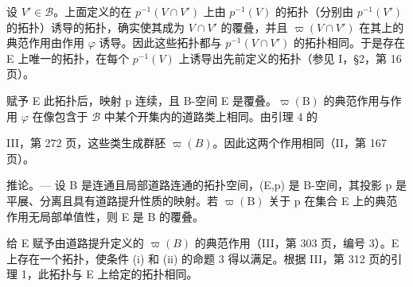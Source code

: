 设 \(V' \in \mathcal{B}\)。上面定义的在 \(p^{-1}(V \cap V')\) 上由 \(p^{-1}(V)\) 的拓扑（分别由 \(p^{-1}(V')\) 的拓扑）诱导的拓扑，确实使其成为 \(V \cap V'\) 的覆叠，并且 \(\varpi(V \cap V')\) 在其上的典范作用由作用 \(\varphi\) 诱导。因此这些拓扑都与 \(p^{-1}(V \cap V')\) 的拓扑相同。于是存在 E 上唯一的拓扑，在每个 \(p^{-1}(V)\) 上诱导出先前定义的拓扑（参见 I，§2，第 16 页）。

赋予 E 此拓扑后，映射 p 连续，且 B-空间 E 是覆叠。\(\varpi(\mathrm{B})\) 的典范作用与作用 \(\varphi\) 在像包含于 \(\mathcal{B}\) 中某个开集内的道路类上相同。由引理 4 的

III，第 272 页，这些类生成群胚 \(\varpi(B)\)。因此这两个作用相同（II，第 167 页）。

推论。--- 设 B 是连通且局部道路连通的拓扑空间，(E,p) 是 B-空间，其投影 p 是平展、分离且具有道路提升性质的映射。若 \(\varpi(\mathrm{B})\) 关于 p 在集合 E 上的典范作用无局部单值性，则 E 是 B 的覆叠。

给 E 赋予由道路提升定义的 \(\varpi(B)\) 的典范作用（III，第 303 页，编号 3）。E 上存在一个拓扑，使条件 (i) 和 (ii) 的命题 3 得以满足。根据 III，第 312 页的引理 1，此拓扑与 E 上给定的拓扑相同。

